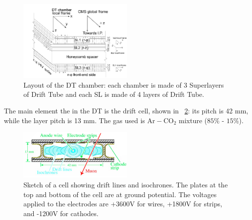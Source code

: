 \begin{figure}[h!]
 \centering
 \includegraphics[width=0.5\textwidth]{Images/DTchamber.png}
 \caption{Layout of the DT chamber: each chamber is made of 3 Superlayers of Drift Tube and each SL is made of 4 layers of Drift Tube.}
\label{DT_chamber}
\end{figure}
The main element the in the DT is the drift cell, shown in \figurename~\ref{DT_cell}: its pitch is 42 mm, while the layer pitch is 13 mm. The gas used is $\mathrm{Ar-CO_{2}}$ mixture ($85\%$ - $15\%$).
\begin{figure}[h!]
 \centering
 \includegraphics[width=0.5\textwidth]{Images/DT_cell}
 \caption{Sketch of a cell showing drift lines and isochrones. The plates at the top and bottom of the cell are at ground potential. The voltages applied to the electrodes are +3600V for wires, +1800V for strips, and -1200V for cathodes.}
\label{DT_cell}
\end{figure}

